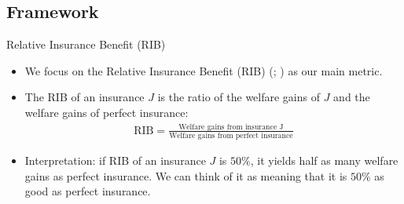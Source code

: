 \documentclass{beamer}
\begin{document}
  

\subsection{Framework}
\begin{frame}{Relative Insurance Benefit (RIB)}
    \begin{itemize}
        \setlength \itemsep{1.5em}
        \item We focus on the Relative Insurance Benefit (RIB) (\cite{kenduiywo2021evaluating}; \cite{estefania2024breaking}) as our main metric. 
        \item The RIB of an insurance $J$ is the ratio of the welfare gains of $J$ and the welfare gains of perfect insurance:
        \begin{align*}
          \text{RIB} = \frac{\text{Welfare gains from insurance J}}{\text{Welfare gains from perfect insurance}}
        \end{align*}
        \item Interpretation: if RIB of an insurance $J$ is $50\%$, it yields half as many welfare gains as perfect insurance. We can think of it as meaning that it is $50\%$ as good as perfect insurance.  
    \end{itemize}
    
\end{frame}

    
\end{document}

